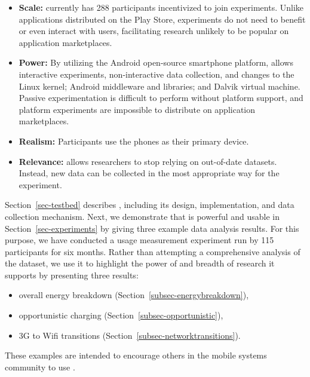 \begin{itemize}[nosep,leftmargin=0.15in,labelwidth=\itemindent]
\vspace*{-0.1in}

\item \textbf{Scale:} \PhoneLab{} currently has 288 participants incentivized
to join experiments. Unlike applications distributed on the Play Store,
\PhoneLab{} experiments do not need to benefit or even interact with users,
facilitating research unlikely to be popular on application marketplaces.

\item \textbf{Power:} By utilizing the Android open-source smartphone
platform, \PhoneLab{} allows interactive experiments, non-interactive data
collection, and changes to the Linux kernel; Android middleware and
libraries; and Dalvik virtual machine. Passive experimentation is difficult
to perform without platform support, and platform experiments are impossible
to distribute on application marketplaces.

\item \textbf{Realism:} Participants use the phones as their primary device.

\item \textbf{Relevance:} \PhoneLab{} allows researchers to stop relying on
out-of-date datasets. Instead, new data can be collected in the most
appropriate way for the experiment.

\vspace*{-0.1in}
\end{itemize}

Section~\ref{sec-testbed} describes \PhoneLab{}, including its design,
implementation, and data collection mechanism. Next, we demonstrate that
\PhoneLab{} is powerful and usable in Section~\ref{sec-experiments} by giving
three example data analysis results. For this purpose, we have conducted a
usage measurement experiment run by 115 \PhoneLab{} participants for six
months. Rather than attempting a comprehensive analysis of the dataset, we
use it to highlight the power of \PhoneLab{} and breadth of research it
supports by presenting three results:

\begin{itemize}[nosep,leftmargin=0.15in,labelwidth=\itemindent]
\vspace*{-0.1in}

\item overall energy breakdown (Section~\ref{subsec-energybreakdown}),

\item opportunistic charging (Section~\ref{subsec-opportunistic}),

\item 3G to Wifi transitions (Section~\ref{subsec-networktransitions}).

\vspace*{-0.1in}
\end{itemize}

These examples are intended to encourage others in the mobile systems
community to use \PhoneLab{}.
